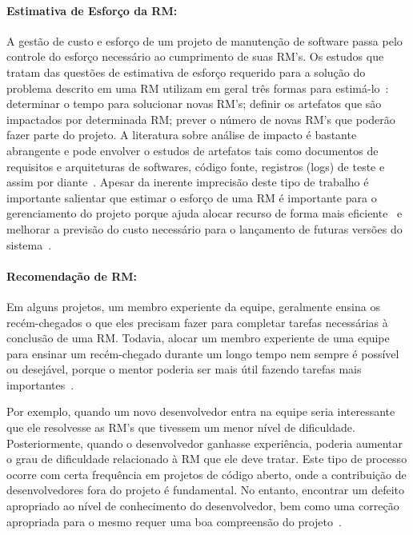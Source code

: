 \paragraph{Estimativa de Esforço da RM:} A gestão de custo e esforço de um
projeto de manutenção de software passa pelo controle do esforço necessário ao
cumprimento de suas RM's. Os estudos que tratam das questões de estimativa de
esforço requerido para a solução do problema descrito em uma RM utilizam em
geral três formas para estimá-lo~\cite{cavalcanti2014challenges}: determinar o
tempo para solucionar novas RM's; definir os artefatos que são impactados por
determinada RM\@; prever o número de novas RM's que poderão fazer parte do
projeto. A literatura sobre análise de impacto é bastante abrangente e pode
envolver o estudos de artefatos tais como documentos de requisitos e
arquiteturas de softwares, código fonte, registros (logs) de teste e assim por
diante~\cite{cavalcanti2014challenges}. Apesar da inerente imprecisão deste tipo
de trabalho é importante salientar que estimar o esforço de uma RM é importante
para o gerenciamento do projeto porque ajuda alocar recurso de forma mais
eficiente~\cite{Bhattacharya:2011:BTP:1985441.1985472} e melhorar a previsão do
custo necessário para o lançamento de futuras versões do
sistema~\cite{Vijayakumar2014}.

\paragraph{Recomendação de RM:} Em alguns projetos, um membro experiente da equipe, geralmente ensina os
recém-chegados o que eles precisam fazer para completar tarefas necessárias à
conclusão de uma RM\@. Todavia, alocar um membro experiente de uma equipe para
ensinar um recém-chegado durante um longo tempo nem sempre é possível ou
desejável, porque o mentor poderia ser mais útil fazendo tarefas mais
importantes~\cite{malheiros2012source}.

Por exemplo, quando um novo desenvolvedor entra na equipe seria
interessante que ele resolvesse as RM's que tivessem um menor nível de
dificuldade. Posteriormente, quando o desenvolvedor ganhasse experiência,
poderia aumentar o grau de dificuldade relacionado à RM que ele deve tratar.
Este tipo de processo ocorre com certa frequência em projetos de código aberto,
onde a contribuição de desenvolvedores fora do projeto é fundamental. No
entanto, encontrar um defeito apropriado ao nível de conhecimento do
desenvolvedor, bem como uma correção apropriada para o mesmo requer uma boa
compreensão do projeto~\cite{Wang2011bug}.

